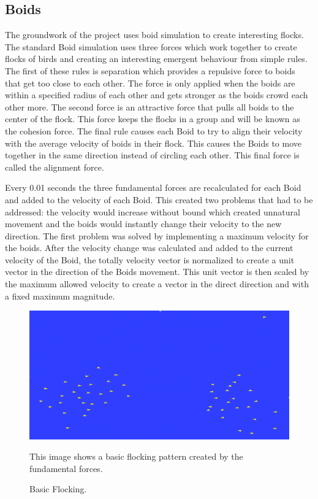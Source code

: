\documentclass{egpubl}
\begin{document}
\subsection{Boids}
\label{forces}
The groundwork of the project uses boid simulation to create interesting flocks. The standard Boid simulation uses three forces which work together to create flocks of birds and creating an interesting emergent behaviour from simple rules. The first of these rules is separation which provides a repulsive force to boids that get too close to each other. The force is only applied when the boids are within a specified radius of each other and gets stronger as the boids crowd each other more. The second force is an attractive force that pulls all boids to the center of the flock. This force keeps the flocks in a group and will be known as the cohesion force. The final rule causes each Boid to try to align their velocity with the average velocity of boids in their flock. This causes the Boids to move together in the same direction instead of circling each other. This final force is called the alignment force.
\par
Every 0.01 seconds the three fundamental forces are recalculated for each Boid and added to the velocity of each Boid. This created two problems that had to be addressed: the velocity would increase without bound which created unnatural movement and the boids would instantly change their velocity to the new direction. The first problem was solved by implementing a maximum velocity for the boids. After the velocity change was calculated and added to the current velocity of the Boid, the totally velocity vector is normalized to create a unit vector in the direction of the Boids movement. This unit vector is then scaled by the maximum allowed velocity to create a vector in the direct direction and with a fixed maximum magnitude. 
\par
\begin{figure}[htb]
  \centering
  \includegraphics[width=.8\linewidth]{basicFlocks}
  \parbox[t]{.9\columnwidth}{\relax
        This image shows a basic flocking pattern created by the fundamental forces.
           }
  \caption{\label{fig:firstExample}
           Basic Flocking.}
\end{figure}
\end{document}
